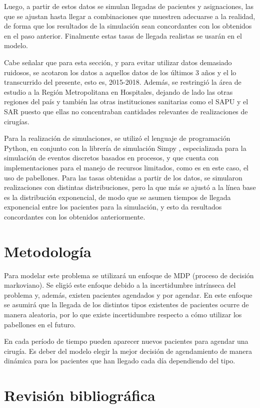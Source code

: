 \documentclass[letterpaper,10pt]{article}
\begin{document}
Luego, a partir de estos datos se simulan llegadas de pacientes y asignaciones, las que se ajustan hasta llegar a combinaciones que muestren adecuarse a la realidad, de forma que los resultados de la simulación sean concordantes con los obtenidos en el paso anterior. Finalmente estas tasas de llegada realistas se usarán en el modelo.

Cabe señalar que para esta sección, y para evitar utilizar datos demasiado ruidosos, se acotaron los datos a aquellos datos de los últimos 3 años y el lo transcurrido del presente, esto es, 2015-2018. Además, se restringió la área de estudio a la Región Metropolitana en Hospitales, dejando de lado las otras regiones del país y también las otras instituciones sanitarias como el SAPU y el SAR puesto que ellas no concentraban cantidades relevantes de realizaciones de cirugías.

Para la realización de simulaciones, se utilizó el lenguaje de programación Python, en conjunto con la librería de simulación Simpy \cite{simpy}, especializada para la simulación de eventos discretos basados en procesos, y que cuenta con implementaciones para el manejo de recursos limitados, como es en este caso, el uso de pabellones. Para las tasas obtenidas a partir de los datos, se simularon realizaciones con distintas distribuciones, pero la que más se ajustó a la línea base es la distribución exponencial, de modo que se asumen tiempos de llegada exponencial entre los pacientes para la simulación, y esto da resultados concordantes con los obtenidos anteriormente. 

\section*{Metodología}
Para modelar este problema se utilizará un enfoque de MDP (proceso de decisión markoviano). Se eligió este enfoque debido a la incertidumbre intrínseca del problema y, además, existen pacientes agendados y por agendar. En este enfoque se asumirá que la llegada de los distintos tipos existentes de pacientes ocurre de manera aleatoria, por lo que existe incertidumbre respecto a cómo utilizar los pabellones en el futuro.

En cada período de tiempo pueden aparecer nuevos pacientes para agendar una cirugía. Es deber del modelo elegir la mejor decisión de agendamiento de manera dinámica para los pacientes que han llegado cada día dependiendo del tipo.

\section*{Revisión bibliográfica}
\end{document}

